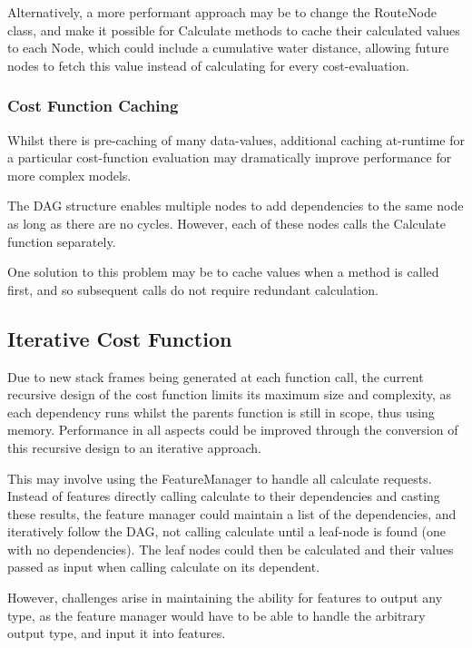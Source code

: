 \documentclass[12pt]{article}
\begin{document}
Alternatively, a more performant approach may be to change the RouteNode class, and make it possible for Calculate methods to cache their calculated values to each Node, which could include a cumulative water distance, allowing future nodes to fetch this value instead of calculating for every cost-evaluation.

\subsubsection{Cost Function Caching}

Whilst there is pre-caching of many data-values, additional caching at-runtime for a particular cost-function evaluation may dramatically improve performance for more complex models.

The DAG structure enables multiple nodes to add dependencies to the same node as long as there are no cycles. However, each of these nodes calls the Calculate function separately.

One solution to this problem may be to cache values when a method is called first, and so subsequent calls do not require redundant calculation.

\subsection{Iterative Cost Function}

Due to new stack frames being generated at each function call, the current recursive design of the cost function limits its maximum size and complexity, as each dependency runs whilst the parents function is still in scope, thus using memory. Performance in all aspects could be improved through the conversion of this recursive design to an iterative approach.

This may involve using the FeatureManager to handle all calculate requests. Instead of features directly calling calculate to their dependencies and casting these results, the feature manager could maintain a list of the dependencies, and iteratively follow the DAG, not calling calculate until a leaf-node is found (one with no dependencies). The leaf nodes could then be calculated and their values passed as input when calling calculate on its dependent.

However, challenges arise in maintaining the ability for features to output any type, as the feature manager would have to be able to handle the arbitrary output type, and input it into features.

\end{document}
